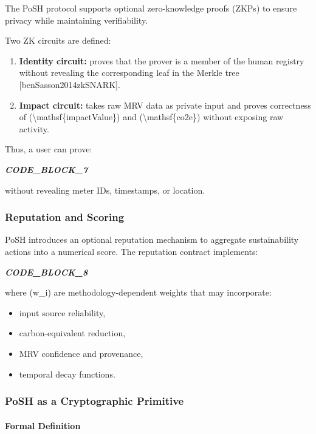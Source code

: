 \documentclass{article}
\begin{document}
The PoSH protocol supports optional zero-knowledge proofs (ZKPs) to ensure
privacy while maintaining verifiability.

Two ZK circuits are defined:

\begin{enumerate}
\item \textbf{Identity circuit:}
proves that the prover is a member of the human registry without revealing
the corresponding leaf in the Merkle tree [benSasson2014zkSNARK].
\item \textbf{Impact circuit:}
takes raw MRV data as private input and proves correctness of
({\textbackslash}mathsf\{impactValue\}) and ({\textbackslash}mathsf\{co2e\}) without exposing raw activity.
\end{enumerate}

Thus, a user can prove:

\textit{\textbf{CODE\_BLOCK\_7}}

without revealing meter IDs, timestamps, or location.

\subsubsection{Reputation and Scoring}

PoSH introduces an optional reputation mechanism to aggregate sustainability
actions into a numerical score. The reputation contract implements:

\textit{\textbf{CODE\_BLOCK\_8}}

where (w\_i) are methodology-dependent weights that may incorporate:

\begin{itemize}
\item input source reliability,
\item carbon-equivalent reduction,
\item MRV confidence and provenance,
\item temporal decay functions.
\end{itemize}

\subsubsection{PoSH as a Cryptographic Primitive}

\paragraph{Formal Definition}
\end{document}
